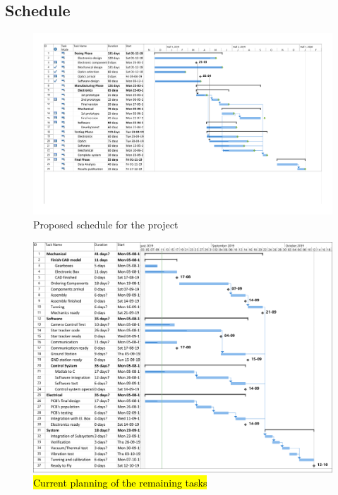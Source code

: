 \begin{landscape}

\subsection{Schedule}
\begin{figure}[H]

\includegraphics[scale=0.65]{3-project-planning/img/Gantt1_15072019.pdf}
\caption{Proposed schedule for the project}
\label{GanttChart}
\end{figure}

\begin{figure}[H]
	\includegraphics[scale=0.65]{3-project-planning/img/Gantt_2.pdf}
	\caption{\hl{Current planning of the remaining tasks}}
	\label{Grantt2}
\end{figure}
\end{landscape}
